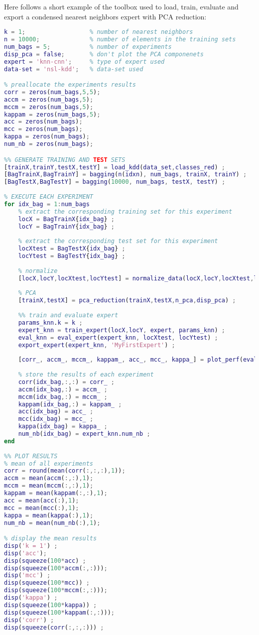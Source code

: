 Here follows a short example of the toolbox used to load, train, evaluate and export a condensed nearest neighbors expert with PCA reduction:
\begin{lstlisting}[language=Matlab]
%% PRELIMINARIES
k = 1;                  % number of nearest neighbors
n = 10000;              % number of elements in the training sets
num_bags = 5;           % number of experiments
disp_pca = false;       % don't plot the PCA componenets
expert = 'knn-cnn';     % type of expert used
data-set = 'nsl-kdd';   % data-set used

% preallocate the experiments results
corr = zeros(num_bags,5,5);
accm = zeros(num_bags,5);
mccm = zeros(num_bags,5);
kappam = zeros(num_bags,5);
acc = zeros(num_bags);
mcc = zeros(num_bags);
kappa = zeros(num_bags);
num_nb = zeros(num_bags);

%% GENERATE TRAINING AND TEST SETS
[trainX,trainY,testX,testY] = load_kdd(data_set,classes_red) ;
[BagTrainX,BagTrainY] = bagging(n(idxn), num_bags, trainX, trainY) ;
[BagTestX,BagTestY] = bagging(10000, num_bags, testX, testY) ;
        
% EXECUTE EACH EXPERIMENT
for idx_bag = 1:num_bags
    % extract the corresponding training set for this experiment
    locX = BagTrainX{idx_bag} ;
    locY = BagTrainY{idx_bag} ;
            
    % extract the corresponding test set for this experiment
    locXtest = BagTestX{idx_bag} ;
    locYtest = BagTestY{idx_bag} ;
            
    % normalize
    [locX,locY,locXtest,locYtest] = normalize_data(locX,locY,locXtest,locYtest) ;
            
    % PCA
    [trainX,testX] = pca_reduction(trainX,testX,n_pca,disp_pca) ;
            
    %% train and evaluate expert
    params_knn.k = k ;
    expert_knn = train_expert(locX,locY, expert, params_knn) ;
    eval_knn = eval_expert(expert_knn, locXtest, locYtest) ;
    export_expert(expert_knn, 'MyFirstExpert') ;
            
    [corr_, accm_, mccm_, kappam_, acc_, mcc_, kappa_] = plot_perf(eval_knn,locYtest) ;
    
    % store the results of each experiment
    corr(idx_bag,:,:) = corr_ ;
    accm(idx_bag,:) = accm_ ;
    mccm(idx_bag,:) = mccm_ ;
    kappam(idx_bag,:) = kappam_ ;
    acc(idx_bag) = acc_ ;
    mcc(idx_bag) = mcc_ ;
    kappa(idx_bag) = kappa_ ;
    num_nb(idx_bag) = expert_knn.num_nb ;
end
    
%% PLOT RESULTS
% mean of all experiments
corr = round(mean(corr(:,:,:),1));
accm = mean(accm(:,:),1);
mccm = mean(mccm(:,:),1);
kappam = mean(kappam(:,:),1);
acc = mean(acc(:),1);
mcc = mean(mcc(:),1);
kappa = mean(kappa(:),1);
num_nb = mean(num_nb(:),1);

% display the mean results
disp('k = 1') ;
disp('acc');
disp(squeeze(100*acc) ;
disp(squeeze(100*accm(:,:)));
disp('mcc') ;
disp(squeeze(100*mcc)) ;
disp(squeeze(100*mccm(:,:)));
disp('kappa') ;
disp(squeeze(100*kappa)) ;
disp(squeeze(100*kappam(:,:)));
disp('corr') ;
disp(squeeze(corr(:,:,:))) ;
\end{lstlisting}

